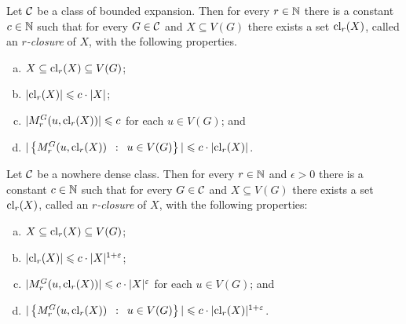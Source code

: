 \begin{lemma}\label{lem:closure-be}
Let $\mathcal{C}$ be a class of bounded expansion. 
Then for every $r\in \mathbb{N}$ there is a constant $c\in \mathbb{N}$ such that for
every $G\in \mathcal{C}$ and $X\subseteq V(G)$ there exists a set $\mathrm{cl}_r(X)$, called an {\em{$r$-closure}} of $X$, with the following properties. 
\begin{enumerate}[(a)]
  \item $X\subseteq \mathrm{cl}_r(X)\subseteq V(G)$;
  \item $|\mathrm{cl}_r(X)|\leqslant c\cdot |X|$; 
  \item $|M_r^G(u,\mathrm{cl}_r(X))|\leqslant c$ for each $u\in V(G)$; and
  \item $|\left\{M_r^G(u,\mathrm{cl}_r(X)) \,~:~\, u\in V(G) \right\}|\leqslant c\cdot |\mathrm{cl}_r(X)|$.
\end{enumerate}
\end{lemma}

\begin{lemma}\label{lem:closure-nd}
Let $\mathcal{C}$ be a nowhere dense class. 
Then for every $r\in\mathbb{N}$ and $\epsilon>0$ there is a 
constant $c\in\mathbb{N}$ such that for every $G\in \mathcal{C}$ and $X\subseteq V(G)$ there exists a set 
$\mathrm{cl}_r(X)$,  called an {\em{$r$-closure}} of $X$, 
with the following properties: 
\begin{enumerate}[(a)]
  \item $X\subseteq \mathrm{cl}_r(X)\subseteq V(G)$;
  \item $|\mathrm{cl}_r(X)|\leqslant c\cdot |X|^{1+\varepsilon}$; 
  \item $|M_r^G(u,\mathrm{cl}_r(X))|\leqslant c\cdot |X|^{\varepsilon}$ for each $u\in V(G)$; and
  \item $|\left\{M_r^G(u,\mathrm{cl}_r(X)) \,~:~\, u\in V(G) \right\}|\leqslant c\cdot |\mathrm{cl}_r(X)|^{1+\varepsilon}$.
\end{enumerate}
\end{lemma}

